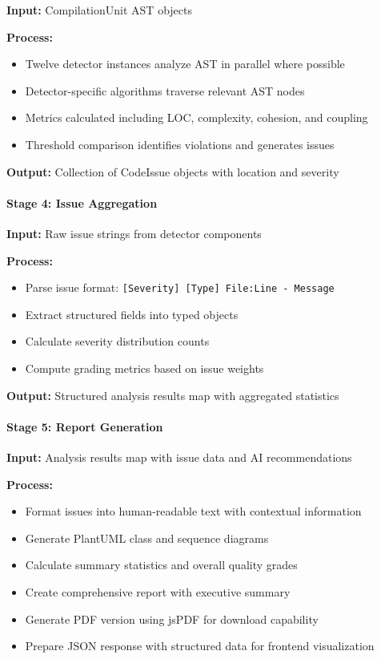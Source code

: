 \documentclass[12pt,a4paper]{article}
\begin{document}
    \textbf{Input:} CompilationUnit AST objects

    \textbf{Process:}
    \begin{itemize}[leftmargin=0.5in]
        \item Twelve detector instances analyze AST in parallel where possible
        \item Detector-specific algorithms traverse relevant AST nodes
        \item Metrics calculated including LOC, complexity, cohesion, and coupling
        \item Threshold comparison identifies violations and generates issues
    \end{itemize}

    \textbf{Output:} Collection of CodeIssue objects with location and severity

    \paragraph{Stage 4: Issue Aggregation}

    \textbf{Input:} Raw issue strings from detector components

    \textbf{Process:}
    \begin{itemize}[leftmargin=0.5in]
        \item Parse issue format: \texttt{[Severity] [Type] File:Line - Message}
        \item Extract structured fields into typed objects
        \item Calculate severity distribution counts
        \item Compute grading metrics based on issue weights
    \end{itemize}

    \textbf{Output:} Structured analysis results map with aggregated statistics

    \paragraph{Stage 5: Report Generation}

    \textbf{Input:} Analysis results map with issue data and AI recommendations

    \textbf{Process:}
    \begin{itemize}[leftmargin=0.5in]
        \item Format issues into human-readable text with contextual information
        \item Generate PlantUML class and sequence diagrams
        \item Calculate summary statistics and overall quality grades
        \item Create comprehensive report with executive summary
        \item Generate PDF version using jsPDF for download capability
        \item Prepare JSON response with structured data for frontend visualization
    \end{itemize}
\end{document}
